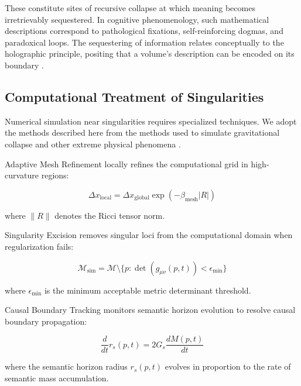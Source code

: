 These constitute sites of recursive collapse at which meaning becomes irretrievably sequestered. In cognitive phenomenology, such mathematical descriptions correspond to pathological fixations, self-reinforcing dogmas, and paradoxical loops. The sequestering of information relates conceptually to the holographic principle, positing that a volume's description can be encoded on its boundary \autocite{tHooft1993, Susskind1995, Maldacena1998}.


\subsection{Computational Treatment of Singularities}
\label{12.2.3:computational_treatment_of_singularities}

Numerical simulation near singularities requires specialized techniques. We adopt the methods described here from the methods used to simulate gravitational collapse and other extreme physical phenomena \autocite{BaumgarteShapiro2010}.

Adaptive Mesh Refinement locally refines the computational grid in high-curvature regions:

\begin{equation}
\Delta x_{\text{local}} = \Delta x_{\text{global}} \exp(-\beta_{\text{mesh}} |R|)
\end{equation}

where \(\|R\|\) denotes the Ricci tensor norm.

Singularity Excision removes singular loci from the computational domain when regularization fails:

\begin{equation}
\mathcal{M}_{\text{sim}} = \mathcal{M} \setminus \{p : \det(g_{\mu\nu}(p, t)) < \epsilon_{\text{min}}\}
\end{equation}

where \(\epsilon_{\text{min}}\) is the minimum acceptable metric determinant threshold.

Causal Boundary Tracking monitors semantic horizon evolution to resolve causal boundary propagation:

\begin{equation}
\frac{d}{dt} r_s(p, t) = 2G_s \frac{dM(p, t)}{dt}
\end{equation}

where the semantic horizon radius \(r_s(p, t)\) evolves in proportion to the rate of semantic mass accumulation.

